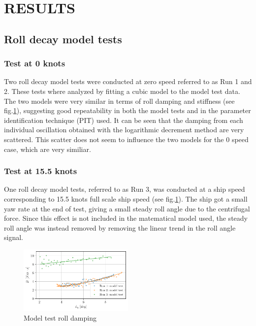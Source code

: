 \section*{RESULTS}\label{results}

\subsection*{Roll decay model tests}\label{roll-decay-model-tests}

\subsubsection*{Test at 0 knots}\label{knots}

Two roll decay model tests were conducted at zero speed referred to as
Run 1 and 2.
These tests where analyzed by fitting a cubic model
to the model test data. The two models were very similar in terms of
roll damping and stiffness (see fig.\ref{fig:mdl}), suggesting
good repeatability in both the model tests and in the parameter
identification technique (PIT) used. It can be seen that the damping
from each individual oscillation obtained with the logarithmic decrement
method are very scattered. This scatter does not seem to influence the
two models for the 0 speed case, which are very similiar.

\subsubsection*{Test at 15.5 knots}\label{knots}

One roll decay model tests, referred to as Run 3, was conducted at a
ship speed corresponding to 15.5 knots full scale ship speed (see
fig.\ref{fig:mdl}). The ship got a small yaw rate
 at the end of test, giving a small steady roll angle due to the
centrifugal force. Since this effect is not included in the matematical
model used, the steady roll angle was instead removed by removing the
linear trend in the roll angle signal.

    

    \begin{figure}[H]
        \begin{center}\includegraphics[width = 0.5\textwidth]{figures/mdl.pdf}\end{center}
        \vspace{-1cm}
        \caption{Model test roll damping}
        \label{fig:mdl}
    \end{figure}
    
